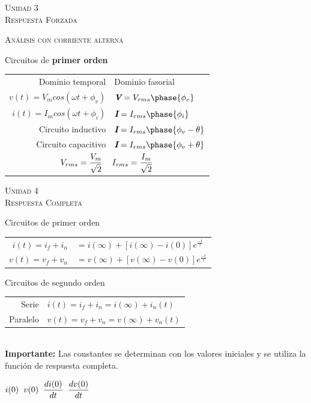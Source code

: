 \documentclass[11pt,a4paper,twocolumn]{article}
\newcommand{\fasor}[1]{\textit{\textbf{#1}}}
\newcommand{\unidad}[2]{\begin{center}
		\fontsize{10}{10}\selectfont\color{gray!50!black}\scshape Unidad #1 \\
		\fontsize{14}{14}\selectfont \scshape #2
\end{center} \vspace{-.6cm}}
\begin{document}
\newpage


\unidad{3}{Respuesta Forzada}

\begin{tcolorbox}[colback=white!97!brown, colframe=brown!15!gray]
	\begin{center}
		\textsc{Análisis con corriente alterna}
	\end{center}
	
	Circuitos de \textbf{primer orden}
	
	\begin{tabular}{r l}
		Dominio temporal & Dominio fasorial \\ \vspace{.1cm}
		$v(t) = V_{m} cos(\omega t + \phi_v )$ & $\fasor{V}=V_{rms} \phase{\phi_v}$ \\  \vspace{.1cm}
		$i(t) = I_{m} cos(\omega t + \phi_i)$ &  $ \fasor{I} = I_{rms}  \phase{\phi_i}$ \\ \vspace{.2cm}
		Circuito inductivo & $\fasor{I}= I_{rms} \phase{\phi_v -\theta}$ \\ \vspace{.2cm}
		Circuito capacitivo & $\fasor{I}=I_{rms} \phase{\phi_v + \theta}$ \\ 
		\multicolumn{2}{c}{$ V_{rms}=\dfrac{V_{m}}{\sqrt{2}} \hspace{.4cm} I_{rms}=\dfrac{I_{m}}{\sqrt{2}} $}
	\end{tabular}
	
	
\end{tcolorbox}


\unidad{4}{Respuesta Completa}
	\begin{tcolorbox}[colback=white!97!brown, colframe=brown!15!gray]
	Circuitos de primer orden
	

		\begin{tabular}{r l}
		$i(t)=i_f+i_n$ &  $=i(\infty)+[i(\infty)-i(0)]e^{\frac{-t}{\tau}}$\\ \vspace{.2cm}
		$v(t)=v_{f}+v_{n}$ & $=v(\infty)+[v(\infty)-v(0)]e^{\frac{-t}{\tau}}$
		\end{tabular}

	
	Circuitos de segundo orden
	
	\begin{tabular}{r l}
		Serie & $i(t)=i_f+i_n=i(\infty)+i_{n}(t)$ \\
		Paralelo & $v(t)=v_f+v_n=v(\infty)+v_{n}(t)$
	\end{tabular}\\


	\textbf{Importante: }Las constantes se determinan con los valores iniciales y se utiliza la función de respuesta completa.
	\begin{center}
		$i(0) \hspace{.2cm} v(0)  \hspace{.2cm} \dfrac{di(0)}{dt} \hspace{.2cm}  \dfrac{dv(0)}{dt}$
	\end{center}
	
	\end{tcolorbox}
	
\end{document}
